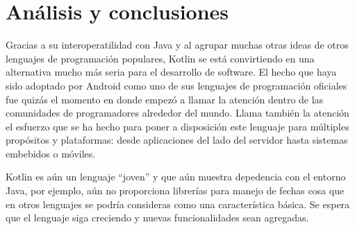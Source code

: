 

\section{Análisis y conclusiones}
Gracias a su interoperatilidad con Java y al agrupar muchas otras ideas de otros lenguajes de programación populares, Kotlin se está convirtiendo en una alternativa mucho más seria para el desarrollo de software. El hecho que haya sido adoptado por Android como uno de sus lenguajes de programación oficiales fue quizás el momento en donde empezó a llamar la atención dentro de las comunidades de programadores alrededor del mundo. Llama también la atención el esfuerzo que se ha hecho para poner a disposición este lenguaje para múltiples propósitos y plataformas: desde aplicaciones del lado del servidor hasta sistemas embebidos o móviles.

Kotlin es aún un lenguaje ``joven'' y que aún muestra depedencia con el entorno Java, por ejemplo, aún no proporciona librerías para manejo de fechas cosa que en otros lenguajes se podría consideras como una característica básica. Se espera que el lenguaje siga creciendo y nuevas funcionalidades sean agregadas.

 

